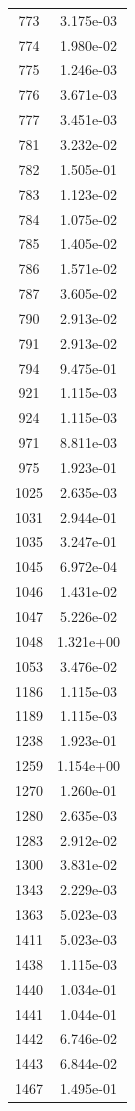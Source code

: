 \documentclass[12pt]{article}
\begin{document}
\begin{longtable}{@{}cc@{}}
773 & 3.175e-03 \\
774 & 1.980e-02 \\
775 & 1.246e-03 \\
776 & 3.671e-03 \\
777 & 3.451e-03 \\
781 & 3.232e-02 \\
782 & 1.505e-01 \\
783 & 1.123e-02 \\
784 & 1.075e-02 \\
785 & 1.405e-02 \\
786 & 1.571e-02 \\
787 & 3.605e-02 \\
790 & 2.913e-02 \\
791 & 2.913e-02 \\
794 & 9.475e-01 \\
921 & 1.115e-03 \\
924 & 1.115e-03 \\
971 & 8.811e-03 \\
975 & 1.923e-01 \\
1025 & 2.635e-03 \\
1031 & 2.944e-01 \\
1035 & 3.247e-01 \\
1045 & 6.972e-04 \\
1046 & 1.431e-02 \\
1047 & 5.226e-02 \\
1048 & 1.321e+00 \\
1053 & 3.476e-02 \\
1186 & 1.115e-03 \\
1189 & 1.115e-03 \\
1238 & 1.923e-01 \\
1259 & 1.154e+00 \\
1270 & 1.260e-01 \\
1280 & 2.635e-03 \\
1283 & 2.912e-02 \\
1300 & 3.831e-02 \\
1343 & 2.229e-03 \\
1363 & 5.023e-03 \\
1411 & 5.023e-03 \\
1438 & 1.115e-03 \\
1440 & 1.034e-01 \\
1441 & 1.044e-01 \\
1442 & 6.746e-02 \\
1443 & 6.844e-02 \\
1467 & 1.495e-01 \\

\end{longtable}
\end{document}

